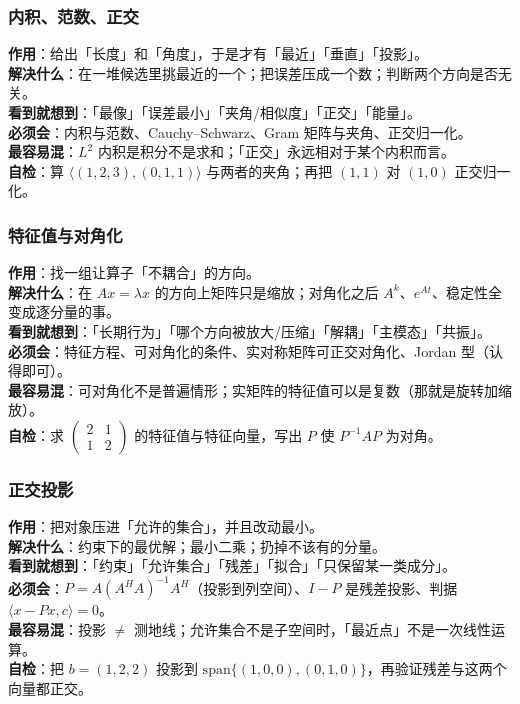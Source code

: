 \subsubsection*{内积、范数、正交}
\textbf{作用}：给出「长度」和「角度」，于是才有「最近」「垂直」「投影」。\\
\textbf{解决什么}：在一堆候选里挑最近的一个；把误差压成一个数；判断两个方向是否无关。\\
\textbf{看到就想到}：「最像」「误差最小」「夹角/相似度」「正交」「能量」。\\
\textbf{必须会}：内积与范数、Cauchy--Schwarz、Gram 矩阵与夹角、正交归一化。\\
\textbf{最容易混}：$L^{2}$ 内积是积分不是求和；「正交」永远相对于某个内积而言。\\
\textbf{自检}：算 $\langle(1,2,3),(0,1,1)\rangle$ 与两者的夹角；再把 $(1,1)$ 对 $(1,0)$ 正交归一化。

\subsubsection*{特征值与对角化}
\textbf{作用}：找一组让算子「不耦合」的方向。\\
\textbf{解决什么}：在 $Ax=\lambda x$ 的方向上矩阵只是缩放；对角化之后 $A^{k}$、$e^{At}$、稳定性全变成逐分量的事。\\
\textbf{看到就想到}：「长期行为」「哪个方向被放大/压缩」「解耦」「主模态」「共振」。\\
\textbf{必须会}：特征方程、可对角化的条件、实对称矩阵可正交对角化、Jordan 型（认得即可）。\\
\textbf{最容易混}：可对角化不是普遍情形；实矩阵的特征值可以是复数（那就是旋转加缩放）。\\
\textbf{自检}：求 $\begin{pmatrix}2&1\\1&2\end{pmatrix}$ 的特征值与特征向量，写出 $P$ 使 $P^{-1}AP$ 为对角。

\subsubsection*{正交投影}
\textbf{作用}：把对象压进「允许的集合」，并且改动最小。\\
\textbf{解决什么}：约束下的最优解；最小二乘；扔掉不该有的分量。\\
\textbf{看到就想到}：「约束」「允许集合」「残差」「拟合」「只保留某一类成分」。\\
\textbf{必须会}：$P=A(A^{H}A)^{-1}A^{H}$（投影到列空间）、$I-P$ 是残差投影、判据 $\langle x-Px,c\rangle=0$。\\
\textbf{最容易混}：投影 $\ne$ 测地线；允许集合不是子空间时，「最近点」不是一次线性运算。\\
\textbf{自检}：把 $b=(1,2,2)$ 投影到 $\mathrm{span}\{(1,0,0),(0,1,0)\}$，再验证残差与这两个向量都正交。

